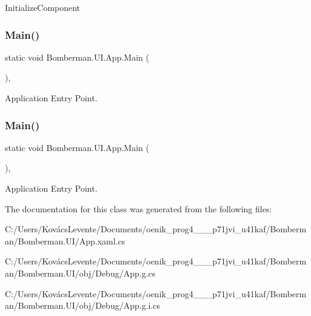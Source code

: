 Initialize\+Component 

\mbox{\label{class_bomberman_1_1_u_i_1_1_app_af5ecd868927d677838c13790bbec91be}} 
\subsubsection{\texorpdfstring{Main()}{Main()}\hspace{0.1cm}{\footnotesize\ttfamily [1/2]}}
{\footnotesize\ttfamily static void Bomberman.\+U\+I.\+App.\+Main (\begin{DoxyParamCaption}{ }\end{DoxyParamCaption})\hspace{0.3cm}{\ttfamily [inline]}, {\ttfamily [static]}}



Application Entry Point. 

\mbox{\label{class_bomberman_1_1_u_i_1_1_app_af5ecd868927d677838c13790bbec91be}} 
\subsubsection{\texorpdfstring{Main()}{Main()}\hspace{0.1cm}{\footnotesize\ttfamily [2/2]}}
{\footnotesize\ttfamily static void Bomberman.\+U\+I.\+App.\+Main (\begin{DoxyParamCaption}{ }\end{DoxyParamCaption})\hspace{0.3cm}{\ttfamily [inline]}, {\ttfamily [static]}}



Application Entry Point. 



The documentation for this class was generated from the following files\+:\begin{DoxyCompactItemize}
\item 
C\+:/\+Users/\+Kovács\+Levente/\+Documents/oenik\+\_\+prog4\+\_\+\_\+\_\+p71jvi\+\_\+u41kaf/\+Bomberman/\+Bomberman.\+U\+I/App.\+xaml.\+cs\item 
C\+:/\+Users/\+Kovács\+Levente/\+Documents/oenik\+\_\+prog4\+\_\+\_\+\_\+p71jvi\+\_\+u41kaf/\+Bomberman/\+Bomberman.\+U\+I/obj/\+Debug/App.\+g.\+cs\item 
C\+:/\+Users/\+Kovács\+Levente/\+Documents/oenik\+\_\+prog4\+\_\+\_\+\_\+p71jvi\+\_\+u41kaf/\+Bomberman/\+Bomberman.\+U\+I/obj/\+Debug/App.\+g.\+i.\+cs\end{DoxyCompactItemize}
